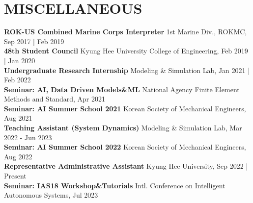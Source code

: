 \documentclass[a4paper,10pt]{extarticle}
\begin{document}
\section*{MISCELLANEOUS}
\textbf{ROK-US Combined Marine Corps Interpreter} \hfill 1st Marine Div., ROKMC, Sep 2017 | Feb 2019\\
\textbf{48th Student Council} \hfill Kyung Hee University College of Engineering, Feb 2019 | Jan 2020\\
\textbf{Undergraduate Research Internship} \hfill Modeling \& Simulation Lab, Jan 2021 | Feb 2022\\
\textbf{Seminar: AI, Data Driven Models\&ML} \hfill {\small National Agency Finite Element Methods and Standard}, Apr 2021\\
\textbf{Seminar: AI Summer School 2021} \hfill Korean Society of Mechanical Engineers, Aug 2021\\
\textbf{Teaching Assistant (System Dynamics)} \hfill Modeling \& Simulation Lab, Mar 2022 - Jun 2023\\
\textbf{Seminar: AI Summer School 2022} \hfill Korean Society of Mechanical Engineers, Aug 2022\\
\textbf{Representative Administrative Assistant} \hfill Kyung Hee University, Sep 2022 | Present\\
\textbf{Seminar: IAS18 Workshop\&Tutorials} \hfill {\small Intl. Conference on Intelligent Autonomous Systems}, Jul 2023\\

\end{document}
